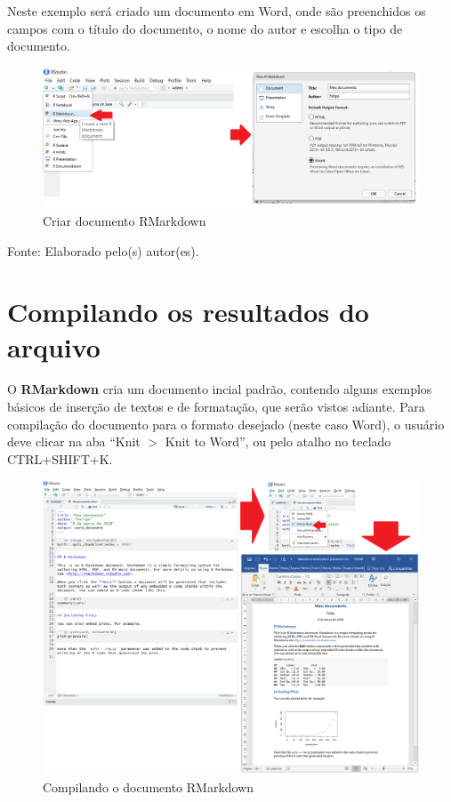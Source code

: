 \documentclass[12pt,brazil,oneside]{book}
\begin{document}
Neste exemplo será criado um documento em Word, onde são preenchidos os campos com o título do documento, o nome do autor e escolha o tipo de documento.

\begin{figure}[H]

{\centering \includegraphics[width=0.7\linewidth]{criararq1} 

}

\caption{Criar documento RMarkdown}\label{fig:criararq1}
\end{figure}

Fonte: Elaborado pelo(s) autor(es).

\hypertarget{compilando-os-resultados-do-arquivo}{%
\section{Compilando os resultados do arquivo}\label{compilando-os-resultados-do-arquivo}}

O \textbf{RMarkdown} cria um documento incial padrão, contendo alguns exemplos básicos de inserção de textos e de formatação, que serão vistos adiante. Para compilação do documento para o formato desejado (neste caso Word), o usuário deve clicar na aba ``Knit \(>\) Knit to Word'', ou pelo atalho no teclado CTRL+SHIFT+K.

\begin{figure}[H]

{\centering \includegraphics[width=0.7\linewidth]{compilar} 

}

\caption{Compilando o documento RMarkdown}\label{fig:compil}
\end{figure}
\end{document}
